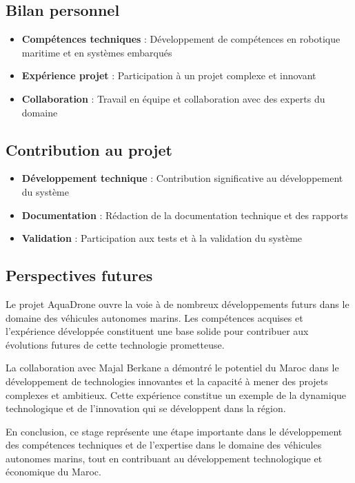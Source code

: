 {\subsection{Bilan personnel}
\begin{itemize}
    \item \textbf{Compétences techniques} : Développement de compétences en robotique maritime et en systèmes embarqués
    \item \textbf{Expérience projet} : Participation à un projet complexe et innovant
    \item \textbf{Collaboration} : Travail en équipe et collaboration avec des experts du domaine
\end{itemize}

\subsection{Contribution au projet}
\begin{itemize}
    \item \textbf{Développement technique} : Contribution significative au développement du système
    \item \textbf{Documentation} : Rédaction de la documentation technique et des rapports
    \item \textbf{Validation} : Participation aux tests et à la validation du système
\end{itemize}

\subsection{Perspectives futures}
Le projet AquaDrone ouvre la voie à de nombreux développements futurs dans le domaine des véhicules autonomes marins. Les compétences acquises et l'expérience développée constituent une base solide pour contribuer aux évolutions futures de cette technologie prometteuse.

La collaboration avec Majal Berkane a démontré le potentiel du Maroc dans le développement de technologies innovantes et la capacité à mener des projets complexes et ambitieux. Cette expérience constitue un exemple de la dynamique technologique et de l'innovation qui se développent dans la région.

En conclusion, ce stage représente une étape importante dans le développement des compétences techniques et de l'expertise dans le domaine des véhicules autonomes marins, tout en contribuant au développement technologique et économique du Maroc.

} 